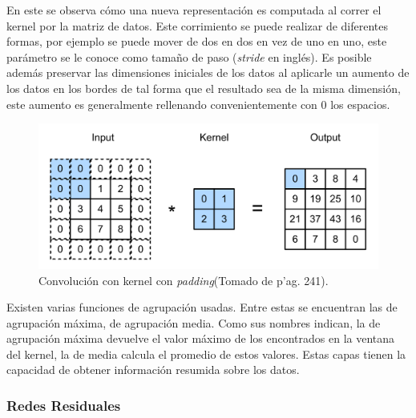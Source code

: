 En este se observa cómo una nueva representación es computada al correr el kernel por la matriz de datos. Este
corrimiento se puede realizar de diferentes formas, por ejemplo se puede mover de dos en dos en vez de uno en uno, este
parámetro se le conoce como tamaño de paso (\emph{stride} en inglés). Es posible además preservar las dimensiones
iniciales de los datos al aplicarle un aumento de los datos en los bordes de tal forma que el resultado sea de la misma
dimensión, este aumento es generalmente rellenando convenientemente con 0 los espacios.

\begin{figure}[h!]
	\begin{center}
		\begin{center}
			\includegraphics[scale=.3]{Graphics/kernel_convolution_padding.png}
        \end{center}
	    \caption{Convolución con kernel con \emph{padding}(Tomado de \cite{d2l} p'ag. 241).}\label{fig:conv_kernel_padding}
	\end{center}
\end{figure}

Existen varias funciones de agrupación usadas. Entre estas se encuentran las de agrupación máxima, de 
agrupación media. Como sus nombres indican, la de agrupación máxima devuelve el valor máximo de los encontrados
en la ventana del kernel, la de media calcula el promedio de estos valores. Estas capas tienen la capacidad de obtener
información resumida sobre los datos.

\subsubsection{Redes Residuales}

